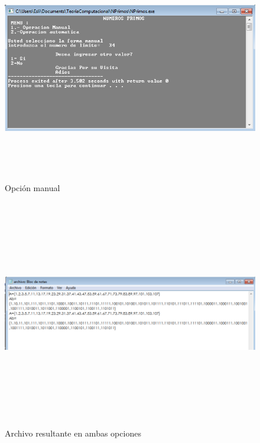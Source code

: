 \documentclass[12pt]{article}
\begin{document}
\begin{figure}[H]
\includegraphics[width=\textwidth, height=10cm]{pmanual}
\caption{Opción manual}
\label{fig:par}
\end{figure}
\begin{figure}[H]
\includegraphics[width=\textwidth, height=10cm]{parchivo}
\caption{Archivo resultante en ambas opciones}
\label{fig:par}
\end{figure}
\end{document}
